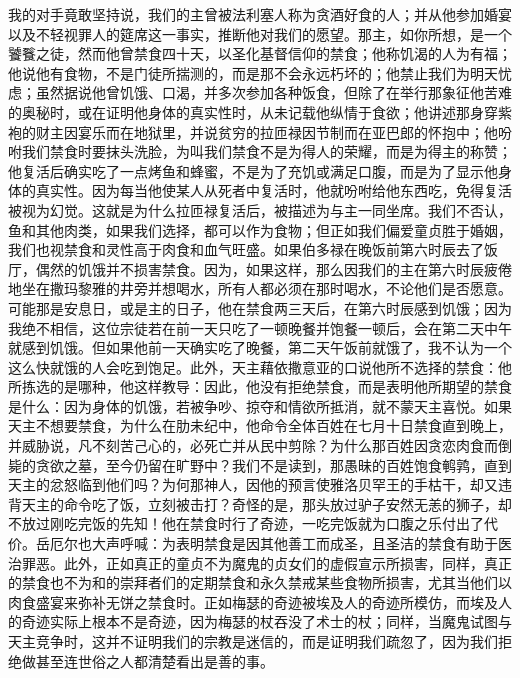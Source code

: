 我的对手竟敢坚持说，我们的主曾被法利塞人称为贪酒好食的人；并从他参加婚宴以及不轻视罪人的筵席这一事实，推断他对我们的愿望。那主，如你所想，是一个饕餮之徒，然而他曾禁食四十天，以圣化基督信仰的禁食；他称饥渴的人为有福；他说他有食物，不是门徒所揣测的，而是那不会永远朽坏的；他禁止我们为明天忧虑；虽然据说他曾饥饿、口渴，并多次参加各种饭食，但除了在举行那象征他苦难的奥秘时，或在证明他身体的真实性时，从未记载他纵情于食欲；他讲述那身穿紫袍的财主因宴乐而在地狱里，并说贫穷的拉匝禄因节制而在亚巴郎的怀抱中；他吩咐我们禁食时要抹头洗脸，为叫我们禁食不是为得人的荣耀，而是为得主的称赞；他复活后确实吃了一点烤鱼和蜂蜜，不是为了充饥或满足口腹，而是为了显示他身体的真实性。因为每当他使某人从死者中复活时，他就吩咐给他东西吃，免得复活被视为幻觉。这就是为什么拉匝禄复活后，被描述为与主一同坐席。我们不否认，鱼和其他肉类，如果我们选择，都可以作为食物；但正如我们偏爱童贞胜于婚姻，我们也视禁食和灵性高于肉食和血气旺盛。如果伯多禄在晚饭前第六时辰去了饭厅，偶然的饥饿并不损害禁食。因为，如果这样，那么因我们的主在第六时辰疲倦地坐在撒玛黎雅的井旁并想喝水，所有人都必须在那时喝水，不论他们是否愿意。可能那是安息日，或是主的日子，他在禁食两三天后，在第六时辰感到饥饿；因为我绝不相信，这位宗徒若在前一天只吃了一顿晚餐并饱餐一顿后，会在第二天中午就感到饥饿。但如果他前一天确实吃了晚餐，第二天午饭前就饿了，我不认为一个这么快就饿的人会吃到饱足。此外，天主藉依撒意亚的口说他所不选择的禁食：他所拣选的是哪种，他这样教导：因此，他没有拒绝禁食，而是表明他所期望的禁食是什么：因为身体的饥饿，若被争吵、掠夺和情欲所抵消，就不蒙天主喜悦。如果天主不想要禁食，为什么在肋未纪中，他命令全体百姓在七月十日禁食直到晚上，并威胁说，凡不刻苦己心的，必死亡并从民中剪除？为什么那百姓因贪恋肉食而倒毙的贪欲之墓，至今仍留在旷野中？我们不是读到，那愚昧的百姓饱食鹌鹑，直到天主的忿怒临到他们吗？为何那神人，因他的预言使雅洛贝罕王的手枯干，却又违背天主的命令吃了饭，立刻被击打？奇怪的是，那头放过驴子安然无恙的狮子，却不放过刚吃完饭的先知！他在禁食时行了奇迹，一吃完饭就为口腹之乐付出了代价。岳厄尔也大声呼喊：为表明禁食是因其他善工而成圣，且圣洁的禁食有助于医治罪恶。此外，正如真正的童贞不为魔鬼的贞女们的虚假宣示所损害，同样，真正的禁食也不为和的崇拜者们的定期禁食和永久禁戒某些食物所损害，尤其当他们以肉食盛宴来弥补无饼之禁食时。正如梅瑟的奇迹被埃及人的奇迹所模仿，而埃及人的奇迹实际上根本不是奇迹，因为梅瑟的杖吞没了术士的杖；同样，当魔鬼试图与天主竞争时，这并不证明我们的宗教是迷信的，而是证明我们疏忽了，因为我们拒绝做甚至连世俗之人都清楚看出是善的事。\par


